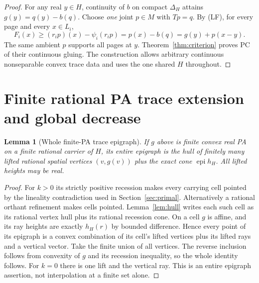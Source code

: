 \documentclass[11pt]{article}
\newtheorem{lemma}[theorem]{Lemma}
\newcommand{\epi}{\operatorname{epi}}
\begin{document}
\begin{proof}
For any real $y\in H$, continuity of $b$ on compact $\Delta_H$ attains
$g(y)=q(y)-b(q)$. Choose \emph{one} joint $p\in M$ with $Tp=q$. By (LF), for every page and every $x\in L_i$,
\[
 F_i(x)\geq (r_ip)(x)-\psi_i(r_ip)=p(x)-b(q)=g(y)+p(x-y).
\]
The same ambient $p$ supports all pages at $y$. Theorem~\ref{thm:criterion} proves PC of their continuous gluing. The construction allows arbitrary continuous nonseparable convex trace data and uses the one shared $H$ throughout.
\end{proof}

\section{Finite rational PA trace extension and global decrease}\label{sec:regularization}
\begin{lemma}[Whole finite-PA trace epigraph]\label{lem:traceepi}
If $g$ above is finite convex real PA on a finite rational carrier of $H$, its entire epigraph is the hull of finitely many lifted rational spatial vertices $(v,g(v))$ plus the exact cone $\epi h_H$. All lifted heights may be real.
\end{lemma}
\begin{proof}
For $k>0$ its strictly positive recession makes every carrying cell pointed by the lineality contradiction used in Section~\ref{sec:primal}. Alternatively a rational orthant refinement makes cells pointed. Lemma~\ref{lem:hull} writes each such cell as its rational vertex hull plus its rational recession cone. On a cell $g$ is affine, and its ray heights are exactly $h_H(r)$ by bounded difference. Hence every point of its epigraph is a convex combination of its cell's lifted vertices plus its lifted rays and a vertical vector. Take the finite union of all vertices. The reverse inclusion follows from convexity of $g$ and its recession inequality, so the whole identity follows. For $k=0$ there is one lift and the vertical ray. This is an entire epigraph assertion, not interpolation at a finite set alone.
\end{proof}
\end{document}
